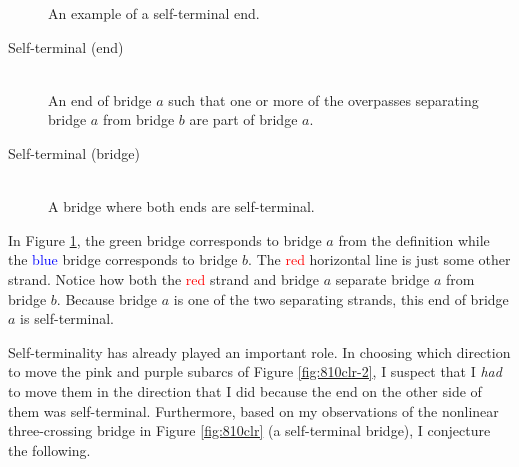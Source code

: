 \documentclass[titlepage]{article}
\begin{document}
\begin{figure}[h!]
    \centering
    \caption{An example of a self-terminal end.}
    \label{fig:selfter}
\end{figure}

\begin{defi}
    \begin{description}
        \item[Self-terminal \textnormal{(end)}] \hfill \\ An end of bridge $a$ such that one or more of the overpasses separating bridge $a$ from bridge $b$ are part of bridge $a$.
        \item[Self-terminal \textnormal{(bridge)}] \hfill \\ A bridge where both ends are self-terminal.
    \end{description}
\end{defi}

In Figure \ref{fig:selfter}, the \textcolor{grx}{green} bridge corresponds to bridge $a$ from the definition while the \textcolor{blue}{blue} bridge corresponds to bridge $b$. The \textcolor{red}{red} horizontal line is just some other strand. Notice how both the \textcolor{red}{red} strand and bridge $a$ separate bridge $a$ from bridge $b$. Because bridge $a$ is one of the two separating strands, this end of bridge $a$ is self-terminal.\par
Self-terminality has already played an important role. In choosing which direction to move the \textcolor{max}{pink} and \textcolor{pux}{purple} subarcs of Figure \ref{fig:810clr-2}, I suspect that I \emph{had} to move them in the direction that I did because the end on the other side of them was self-terminal. Furthermore, based on my observations of the nonlinear three-crossing bridge in Figure \ref{fig:810clr} (a self-terminal bridge), I conjecture the following.
\end{document}

